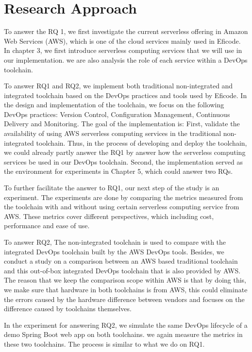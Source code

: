 \section{Research Approach} 
\par
To answer the RQ 1, we first investigate the current serverless offering in Amazon Web Services (AWS), which is one of the cloud services mainly used in Eficode. In chapter 3, we first introduce serverless computing services that we will use in our implementation. we are also analysis the role of each service within a DevOps toolchain.
\par
To answer RQ1 and RQ2, we implement both traditional non-integrated and integrated toolchain based on the DevOps practices and tools used by Eficode. In the design and implementation of the toolchain, we focus on the following DevOps practices: Version Control, Configuration Management, Continuous Delivery and Monitoring. The goal of the implementation is: First, validate the availability of using AWS serverless computing services in the traditional non-integrated toolchain. Thus, in the process of developing and deploy the toolchain, we could already partly answer the RQ1 by answer how the serverless computing services be used in our DevOps toolchain. Second, the implementation served as the environment for experiments in Chapter 5, which could answer two RQs.
\par
To further facilitate the answer to RQ1, our next step of the study is an experiment.
The experiments are done by comparing the metrics measured from the toolchain with and without using certain serverless computing service from AWS. These metrics cover different perspectives, which including cost, performance and ease of use. 
\par
To answer RQ2, The non-integrated toolchain is used to compare with the integrated DevOps toolchain built by the AWS DevOps tools.
Besides, we conduct a study on a comparison between an AWS based traditional toolchain and this out-of-box integrated DevOps toolchain that is also provided by AWS. The reason that we keep the comparison scope within AWS is that by doing this, we make sure that hardware in both toolchains is from AWS, this could eliminate the errors caused by the hardware difference between vendors and focuses on the difference caused by toolchains themselves.
\par
In the experiment for answering RQ2, we simulate the same DevOps lifecycle of a demo Spring Boot web app on both toolchains. we again measure the metrics in these two toolchains. The process is similar to what we do on RQ1.
